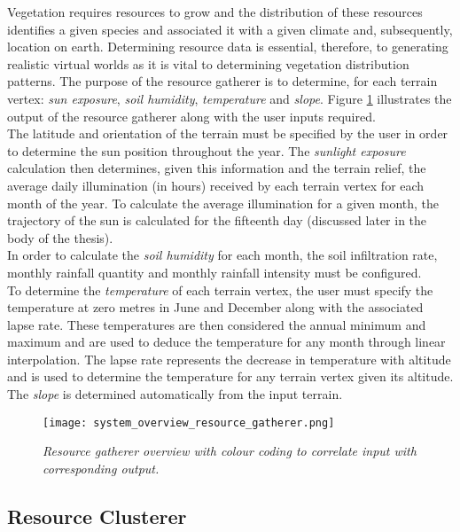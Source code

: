 Vegetation requires resources to grow and the distribution of these resources identifies a given species and associated it with a given climate and, subsequently, location on earth. Determining resource data is essential, therefore, to generating realistic virtual worlds as it is vital to determining vegetation distribution patterns. The purpose of the resource gatherer is to determine, for each terrain vertex: \textit{sun exposure}, \textit{soil humidity}, \textit{temperature} and \textit{slope}. Figure \ref{fig:system_overview_resource_gatherer} illustrates the output of the resource gatherer along with the user inputs required.\\
The latitude and orientation of the terrain must be specified by the user in order to determine the sun position throughout the year. The \textit{sunlight exposure} calculation then determines, given this information and the terrain relief, the average daily illumination (in hours) received by each terrain vertex for each month of the year. To calculate the average illumination for a given month, the trajectory of the sun is calculated for the fifteenth day (discussed later in the body of the thesis). \\
In order to calculate the \textit{soil humidity} for each month, the soil infiltration rate, monthly rainfall quantity and monthly rainfall intensity must be configured.\\
To determine the \textit{temperature} of each terrain vertex, the user must specify the temperature at zero metres in June and December along with the associated lapse rate. These temperatures are then considered the annual minimum and maximum and are used to deduce the temperature for any month through linear interpolation. The lapse rate represents the decrease in temperature with altitude and is used to determine the temperature for any terrain vertex given its altitude. \\
The \textit{slope} is determined automatically from the input terrain.\\

\begin{figure}
\center
	\texttt{[image: system\_overview\_resource\_gatherer.png]}
	\caption{ \textit{Resource gatherer overview with colour coding to correlate input with corresponding output.}}	
	\label{fig:system_overview_resource_gatherer}
\end{figure}

\subsection{Resource Clusterer}

